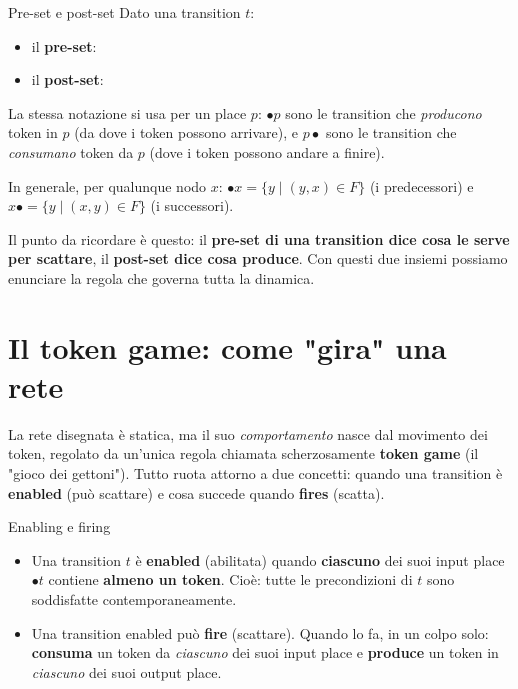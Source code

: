 \begin{boxdefinition}{Pre-set e post-set}
Dato una transition $t$:

\begin{itemize}
\item il \textbf{pre-set}:
\end{itemize}

\begin{itemize}
\item il \textbf{post-set}:
\end{itemize}

La stessa notazione si usa per un place $p$: $\bullet p$ sono le transition che \emph{producono} token in $p$ (da dove i token possono arrivare), e $p \bullet$ sono le transition che \emph{consumano} token da $p$ (dove i token possono andare a finire).

In generale, per qualunque nodo $x$: \(\bullet x = \{ y \mid (y,x) \in F \}\) (i predecessori) e \(x\bullet = \{ y \mid (x,y) \in F \}\) (i successori).
\end{boxdefinition}

Il punto da ricordare è questo: il \textbf{pre-set di una transition dice cosa le serve per scattare}, il \textbf{post-set dice cosa produce}. Con questi due insiemi possiamo enunciare la regola che governa tutta la dinamica.

\section{\texorpdfstring{Il token game: come "gira" una rete}{Il token game: come "gira" una rete}}

La rete disegnata è statica, ma il suo \emph{comportamento} nasce dal movimento dei token, regolato da un'unica regola chiamata scherzosamente \textbf{token game} (il "gioco dei gettoni"). Tutto ruota attorno a due concetti: quando una transition è \textbf{enabled} (può scattare) e cosa succede quando \textbf{fires} (scatta).

\begin{boxdefinition}{Enabling e firing}
\begin{itemize}
\item Una transition $t$ è \textbf{enabled} (abilitata) quando \textbf{ciascuno} dei suoi input place $\bullet t$ contiene \textbf{almeno un token}. Cioè: tutte le precondizioni di $t$ sono soddisfatte contemporaneamente.
\item Una transition enabled può \textbf{fire} (scattare). Quando lo fa, in un colpo solo: \textbf{consuma} un token da \emph{ciascuno} dei suoi input place e \textbf{produce} un token in \emph{ciascuno} dei suoi output place.
\end{itemize}
\end{boxdefinition}

